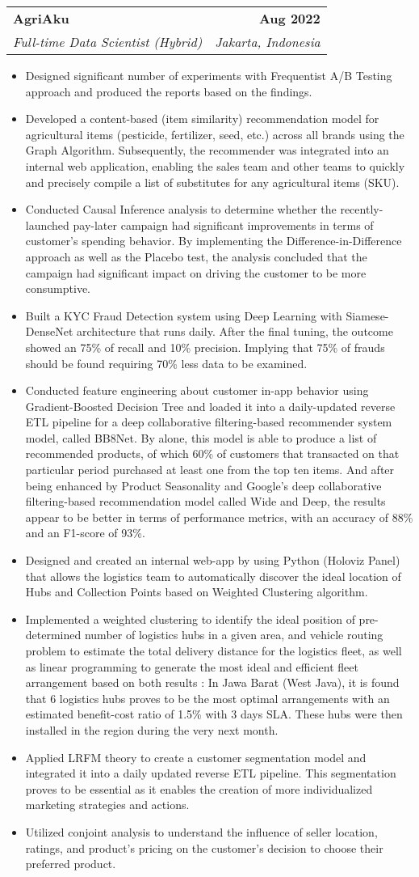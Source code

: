 \documentclass[letterpaper,11pt]{article}
\makeatletter
\newcommand{\resumeItem}[1]{
	\item\small{
		{#1 \vspace{-2pt}}
	}
}
\newcommand{\resumeSubheading}[4]{
	\vspace{-2pt}\item
	\begin{tabular*}{1.0\textwidth}[t]{l@{\extracolsep{\fill}}r}
		\textbf{#1} & \textbf{\small #2} \\
		\textit{\small#3} & \textit{\small #4} \\
	\end{tabular*}\vspace{-7pt}
}
\newcommand{\resumeItemListStart}{\begin{itemize}}
\newcommand{\resumeItemListEnd}{\end{itemize}\vspace{-5pt}}
\makeatother
\begin{document}
	\resumeSubheading
	{AgriAku}{Aug 2022}
	{Full-time Data Scientist (Hybrid)}{Jakarta, Indonesia}
	\resumeItemListStart
	\resumeItem{Designed significant number of experiments with Frequentist A/B Testing approach and produced the reports based on the findings.}
	\resumeItem{Developed a content-based (item similarity) recommendation model for agricultural items (pesticide, fertilizer, seed, etc.) across all brands using the Graph Algorithm. Subsequently, the recommender was integrated into an internal web application, enabling the sales team and other teams to quickly and precisely compile a list of substitutes for any agricultural items (SKU). }
	\resumeItem{Conducted Causal Inference analysis to determine whether the recently-launched pay-later campaign had significant improvements in terms of customer's spending behavior. By implementing the Difference-in-Difference approach as well as the Placebo test, the analysis concluded that the campaign had significant impact on driving the customer to be more consumptive.}
	\resumeItem{Built a KYC Fraud Detection system using Deep Learning with Siamese-DenseNet architecture that runs daily. After the final tuning, the outcome showed an 75\% of recall and 10\% precision. Implying that 75\% of frauds should be found requiring 70\% less data to be examined.}
	\resumeItem{Conducted feature engineering about customer in-app behavior using Gradient-Boosted Decision Tree and loaded it into a daily-updated reverse ETL pipeline for a deep collaborative filtering-based recommender system model, called BB8Net. By alone, this model is able to produce a list of recommended products, of which 60\% of customers that transacted on that particular period purchased at least one from the top ten items. And after being enhanced by Product Seasonality and Google's deep collaborative filtering-based recommendation model called Wide and Deep, the results appear to be better in terms of performance metrics, with an accuracy of 88\% and an F1-score of 93\%.}
	\resumeItem{Designed and created an internal web-app by using Python (Holoviz Panel) that allows the logistics team to automatically discover the ideal location of Hubs and Collection Points based on Weighted Clustering algorithm.}
	\resumeItem{Implemented a weighted clustering to identify the ideal position of pre-determined number of logistics hubs in a given area, and vehicle routing problem to estimate the total delivery distance for the logistics fleet, as well as linear programming to generate the most ideal and efficient fleet arrangement based on both results : In Jawa Barat (West Java), it is found that 6 logistics hubs proves to be the most optimal arrangements with an estimated benefit-cost ratio of 1.5\% with 3 days SLA. These hubs were then installed in the region during the very next month.}
	\resumeItem{Applied LRFM theory to create a customer segmentation model and integrated it into a daily updated reverse ETL pipeline. This segmentation proves to be essential as it enables the creation of more individualized marketing strategies and actions.}
	\resumeItem{Utilized conjoint analysis to understand the influence of seller location, ratings, and product's pricing on the customer's decision to choose their preferred product.}
	\resumeItemListEnd
\end{document}
